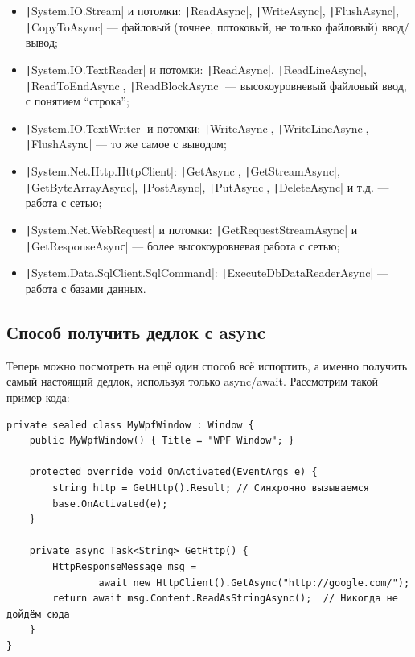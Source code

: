\documentclass[a5paper]{article}
\begin{document}
\begin{itemize}
    \item \texttt|System.IO.Stream| и потомки: \texttt|ReadAsync|, \texttt|WriteAsync|, \texttt|FlushAsync|, \texttt|CopyToAsync| --- файловый (точнее, потоковый, не только файловый) ввод/вывод;
    \item \texttt|System.IO.TextReader| и потомки: \texttt|ReadAsync|, \texttt|ReadLineAsync|, \texttt|ReadToEndAsync|, \texttt|ReadBlockAsync| --- высокоуровневый файловый ввод, с понятием ``строка'';
    \item \texttt|System.IO.TextWriter| и потомки: \texttt|WriteAsync|, \texttt|WriteLineAsync|, \texttt|FlushAsynс| --- то же самое с выводом;
    \item \texttt|System.Net.Http.HttpClient|: \texttt|GetAsync|, \texttt|GetStreamAsync|, \texttt|GetByteArrayAsync|, \texttt|PostAsync|, \texttt|PutAsync|, \texttt|DeleteAsync| и т.д. --- работа с сетью;
    \item \texttt|System.Net.WebRequest| и потомки: \texttt|GetRequestStreamAsync| и \texttt|GetResponseAsynс| --- более высокоуровневая работа с сетью;
    \item \texttt|System.Data.SqlClient.SqlCommand|: \texttt|ExecuteDbDataReaderAsync| --- работа с базами данных.
\end{itemize}

\subsection{Способ получить дедлок с async}

Теперь можно посмотреть на ещё один способ всё испортить, а именно получить самый настоящий дедлок, используя только async/await. Рассмотрим такой пример кода:

\begin{verbatim}
private sealed class MyWpfWindow : Window {
    public MyWpfWindow() { Title = "WPF Window"; }

    protected override void OnActivated(EventArgs e) {
        string http = GetHttp().Result; // Синхронно вызываемся
        base.OnActivated(e);
    }

    private async Task<String> GetHttp() {
        HttpResponseMessage msg = 
                await new HttpClient().GetAsync("http://google.com/");
        return await msg.Content.ReadAsStringAsync();  // Никогда не дойдём сюда
    }
}
\end{verbatim}
\end{document}
